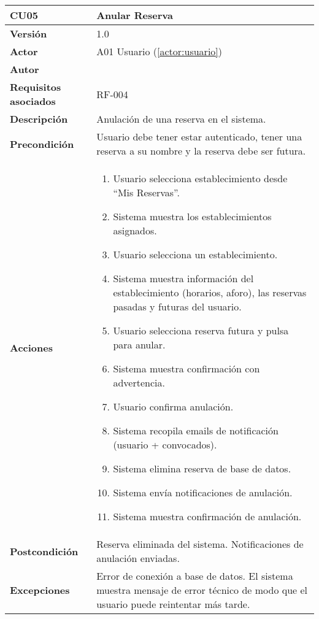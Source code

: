 \begin{table}[H]
	\centering
	\begin{tabularx}{\linewidth}{ p{} p{} }
		\toprule
		\textbf{CU05}    & \textbf{Anular Reserva} \\
		\toprule
		\textbf{Versión}              & 1.0    \\
		\textbf{Actor}                & A01 Usuario (\ref{actor:usuario}) \\
		\textbf{Autor}                & \nombre \\
		\textbf{Requisitos asociados} & RF-004 \\
		\textbf{Descripción}          & Anulación de una reserva en el sistema. \\
		\textbf{Precondición}         & Usuario debe tener estar autenticado, tener una reserva a su nombre y la reserva debe ser futura. \\
		\textbf{Acciones}             &
		\begin{enumerate}
			\def\labelenumi{\arabic{enumi}.}
			\tightlist
			\item Usuario selecciona establecimiento desde ``Mis Reservas''.
            \item Sistema muestra los establecimientos asignados.
            \item Usuario selecciona un establecimiento.
            \item Sistema muestra información del establecimiento (horarios, aforo), las reservas pasadas y futuras del usuario.
            \item Usuario selecciona reserva futura y pulsa para anular.
            \item Sistema muestra confirmación con advertencia.
            \item Usuario confirma anulación.
            \item Sistema recopila emails de notificación (usuario + convocados).
            \item Sistema elimina reserva de base de datos.
            \item Sistema envía notificaciones de anulación.
            \item Sistema muestra confirmación de anulación.
		\end{enumerate}\\
		\textbf{Postcondición}        & Reserva eliminada del sistema. Notificaciones de anulación enviadas.\\
		\textbf{Excepciones}          & Error de conexión a base de datos. El sistema muestra mensaje de error técnico de modo que el usuario puede reintentar más tarde.\\

\end{tabularx}
\end{table}
